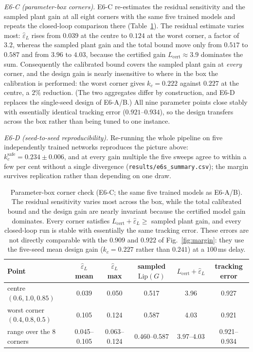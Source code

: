 \documentclass[11pt,sagev,times]{sagej}
\newcommand{\Lhat}{L_{\mathrm{cert}}}
\newcommand{\epsL}{\varepsilon_L}
\begin{document}
\emph{E6-C (parameter-box corners).} E6-C re-estimates the residual sensitivity and the
sampled plant gain at all eight corners with the same five trained models and
repeats the closed-loop comparison there (Table~\ref{tab:e6c}). The residual
estimate varies most: $\hat\epsL$ rises from $0.039$ at the centre to $0.124$
at the worst corner, a factor of $3.2$, whereas the sampled plant gain and the
total bound move only from $0.517$ to $0.587$ and from $3.96$ to $4.03$,
because the certified gain $\Lhat\approx3.9$ dominates the sum.
Consequently the calibrated bound covers the sampled plant gain at
\emph{every} corner, and the design gain is nearly insensitive to where in the
box the calibration is performed: the worst corner gives $k_c=0.222$ against
$0.227$ at the centre, a $2\%$ reduction. (The two aggregates differ by construction, and E6-D replaces
the single-seed design of E6-A/B.) All nine parameter points close stably with
essentially identical tracking error ($0.921$--$0.934$), so the design
transfers across the box rather than being tuned to one instance.

\emph{E6-D (seed-to-seed reproducibility).} Re-running the whole pipeline on
five independently trained networks reproduces the picture above:
$k_c^{\mathrm{safe}}=0.234\pm0.006$, and at every gain multiple the five
sweeps agree to within a few per cent without a single divergence
(\texttt{results/e6s\_summary.csv}); the margin survives replication rather
than depending on one draw.

\begin{table}[t]
\centering\small
\caption{Parameter-box corner check (E6-C; the same five trained models as
E6-A/B). The residual sensitivity varies most across the box, while the total
calibrated bound and the design gain are nearly invariant because the
certified model gain dominates. Every corner satisfies
$\Lhat+\hat\epsL\ge$ sampled plant gain, and every closed-loop run is stable
with essentially the same tracking error. These errors are not directly
comparable with the $0.909$ and $0.922$ of Fig.~\ref{fig:margin}: they use
the five-seed mean design gain ($k_c=0.227$ rather than $0.241$) at a
$100$\,ms delay.}
\label{tab:e6c}
\begin{tabular}{lccccc}
\toprule
Point & $\hat\epsL$ mean & $\hat\epsL$ max & sampled $\mathrm{Lip}(G)$ & $\Lhat+\hat\epsL$ & tracking error \\
\midrule
centre $(0.6,1.0,0.85)$        & 0.039 & 0.050 & 0.517 & 3.96 & 0.927 \\
worst corner $(0.4,0.8,0.5)$   & 0.105 & 0.124 & 0.587 & 4.03 & 0.921 \\
\multicolumn{1}{l}{range over the 8 corners} & 0.045--0.105 & 0.063--0.124 & 0.460--0.587 & 3.97--4.03 & 0.921--0.934 \\
\bottomrule
\end{tabular}
\end{table}
\end{document}
